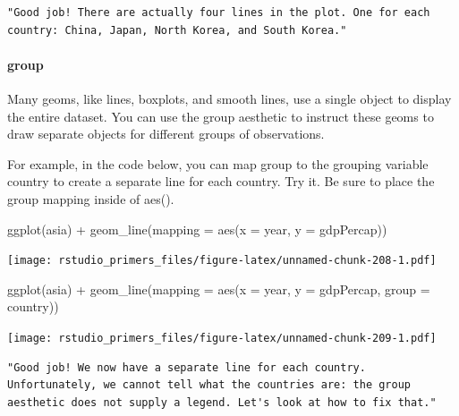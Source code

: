\documentclass[
]{article}
\newenvironment{Shaded}{\begin{snugshade}}{\end{snugshade}}
\newcommand{\AttributeTok}[1]{\textcolor[rgb]{0.77,0.63,0.00}{#1}}
\newcommand{\FunctionTok}[1]{\textcolor[rgb]{0.00,0.00,0.00}{#1}}
\newcommand{\NormalTok}[1]{#1}
\newcommand{\SpecialCharTok}[1]{\textcolor[rgb]{0.00,0.00,0.00}{#1}}
\begin{document}
\begin{verbatim}
"Good job! There are actually four lines in the plot. One for each country: China, Japan, North Korea, and South Korea."
\end{verbatim}

\hypertarget{group}{%
\paragraph{group}\label{group}}

Many geoms, like lines, boxplots, and smooth lines, use a single object
to display the entire dataset. You can use the group aesthetic to
instruct these geoms to draw separate objects for different groups of
observations.

For example, in the code below, you can map group to the grouping
variable country to create a separate line for each country. Try it. Be
sure to place the group mapping inside of aes().

\begin{Shaded}
\begin{Highlighting}[]
\FunctionTok{ggplot}\NormalTok{(asia) }\SpecialCharTok{+}
  \FunctionTok{geom\_line}\NormalTok{(}\AttributeTok{mapping =} \FunctionTok{aes}\NormalTok{(}\AttributeTok{x =}\NormalTok{ year, }\AttributeTok{y =}\NormalTok{ gdpPercap))}
\end{Highlighting}
\end{Shaded}

\texttt{[image: rstudio\_primers\_files/figure-latex/unnamed-chunk-208-1.pdf]}

\begin{Shaded}
\begin{Highlighting}[]
\FunctionTok{ggplot}\NormalTok{(asia) }\SpecialCharTok{+}
  \FunctionTok{geom\_line}\NormalTok{(}\AttributeTok{mapping =} \FunctionTok{aes}\NormalTok{(}\AttributeTok{x =}\NormalTok{ year, }\AttributeTok{y =}\NormalTok{ gdpPercap, }\AttributeTok{group =}\NormalTok{ country))}
\end{Highlighting}
\end{Shaded}

\texttt{[image: rstudio\_primers\_files/figure-latex/unnamed-chunk-209-1.pdf]}

\begin{verbatim}
"Good job! We now have a separate line for each country. Unfortunately, we cannot tell what the countries are: the group aesthetic does not supply a legend. Let's look at how to fix that."
\end{verbatim}
\end{document}
